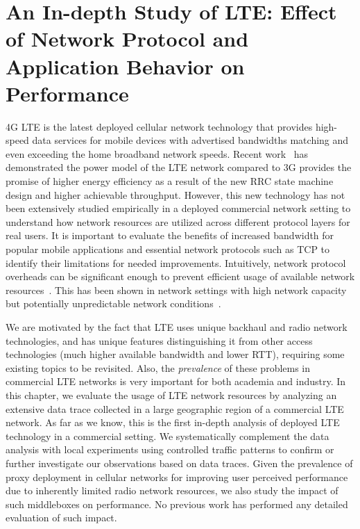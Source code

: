 \chapter{An In-depth Study of LTE: Effect of Network Protocol and Application Behavior on Performance}
\label{chap:tcp}

4G LTE is the latest deployed cellular network technology that
provides high-speed data services for mobile devices with advertised
bandwidths matching and even exceeding the home broadband network
speeds. Recent work~\cite{huang_mobisys12} has demonstrated the power model of the LTE
network compared to 3G provides the promise of higher energy
efficiency as a result of the new RRC state machine design and higher
achievable throughput. However, this new technology has not been
extensively studied empirically in a deployed commercial network setting to
understand how network resources are utilized across different
protocol layers for real users. It is important to evaluate the
benefits of increased bandwidth for popular mobile applications and
essential network protocols such as TCP to identify their limitations
for needed improvements. Intuitively, network protocol overheads can
be significant enough to prevent efficient usage of available network
resources~\cite{Zhuang:A3:Mobicom2006}. This has been shown in network settings with high network
capacity but potentially unpredictable network conditions~\cite{rfc1323}.


We are motivated by the fact that LTE uses unique backhaul and radio network technologies, and has unique features distinguishing it from other access technologies (\eg much higher available bandwidth and lower RTT), requiring some existing topics to be revisited. Also, the {\em prevalence} of these problems in commercial LTE networks is very important for both academia and industry. In this chapter, we evaluate the usage of LTE network resources by analyzing an extensive data trace collected in a large geographic region of a commercial LTE network. As far as we know, this is the first in-depth analysis of deployed LTE technology in a commercial setting.  We systematically complement the data analysis with local experiments using controlled traffic patterns to confirm or further investigate our observations based on data traces. Given the prevalence of proxy deployment in cellular networks for improving user perceived performance due to inherently limited radio network resources, we also study the impact of such middleboxes on performance. No previous work has performed any detailed evaluation of such impact.

